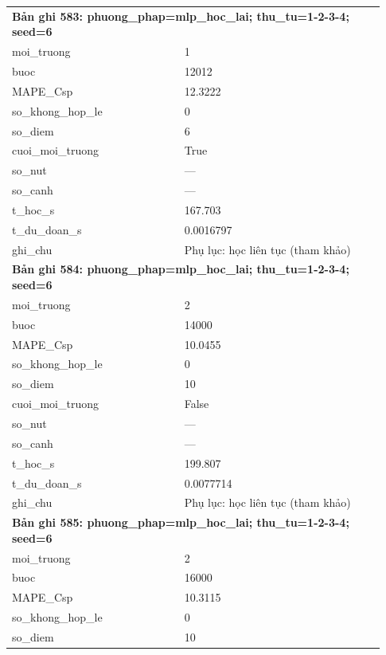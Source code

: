 \begin{longtable}{p{0.43\linewidth}p{0.50\linewidth}}
\midrule
\multicolumn{2}{p{0.95\linewidth}}{\textbf{Bản ghi 583: phuong\_phap=mlp\_hoc\_lai; thu\_tu=1-2-3-4; seed=6}} \\
moi\_\allowbreak truong & 1 \\
buoc & 12012 \\
MAPE\_\allowbreak Csp & 12.3222 \\
so\_\allowbreak khong\_\allowbreak hop\_\allowbreak le & 0 \\
so\_\allowbreak diem & 6 \\
cuoi\_\allowbreak moi\_\allowbreak truong & True \\
so\_\allowbreak nut & — \\
so\_\allowbreak canh & — \\
t\_\allowbreak hoc\_\allowbreak s & 167.703 \\
t\_\allowbreak du\_\allowbreak doan\_\allowbreak s & 0.0016797 \\
ghi\_\allowbreak chu & Phụ lục: học liên tục (tham khảo) \\
\midrule
\multicolumn{2}{p{0.95\linewidth}}{\textbf{Bản ghi 584: phuong\_phap=mlp\_hoc\_lai; thu\_tu=1-2-3-4; seed=6}} \\
moi\_\allowbreak truong & 2 \\
buoc & 14000 \\
MAPE\_\allowbreak Csp & 10.0455 \\
so\_\allowbreak khong\_\allowbreak hop\_\allowbreak le & 0 \\
so\_\allowbreak diem & 10 \\
cuoi\_\allowbreak moi\_\allowbreak truong & False \\
so\_\allowbreak nut & — \\
so\_\allowbreak canh & — \\
t\_\allowbreak hoc\_\allowbreak s & 199.807 \\
t\_\allowbreak du\_\allowbreak doan\_\allowbreak s & 0.0077714 \\
ghi\_\allowbreak chu & Phụ lục: học liên tục (tham khảo) \\
\midrule
\multicolumn{2}{p{0.95\linewidth}}{\textbf{Bản ghi 585: phuong\_phap=mlp\_hoc\_lai; thu\_tu=1-2-3-4; seed=6}} \\
moi\_\allowbreak truong & 2 \\
buoc & 16000 \\
MAPE\_\allowbreak Csp & 10.3115 \\
so\_\allowbreak khong\_\allowbreak hop\_\allowbreak le & 0 \\
so\_\allowbreak diem & 10 \\

\end{longtable}
